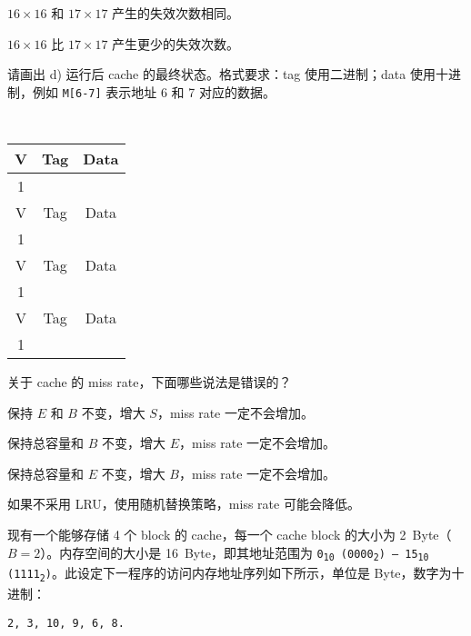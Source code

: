 \begin{problems}
\begin{choices}
                \item $16 \times 16$ 和 $17 \times 17$ 产生的失效次数相同。
                \item $16 \times 16$ 比 $17 \times 17$ 产生更少的失效次数。
            \end{choices}
            \subqn 请画出 d) 运行后 cache 的最终状态。格式要求：tag 使用二进制；data 使用十进制，例如 \verb|M[6-7]| 表示地址 6 和 7 对应的数据。
            \begin{table}[H]
                \tt
                \centering
                \begin{tabular}{|c|c|c|}
                    \hline
                    V & {\qquad \qquad Tag \qquad \qquad} & {\qquad \qquad Data \qquad \qquad} \\ \hline
                    1 &  &  \\ \hline \hline
                    V & Tag & Data \\ \hline
                    1 &  &  \\ \hline \hline
                    V & Tag & Data \\ \hline
                    1 &  &  \\ \hline \hline
                    V & Tag & Data \\ \hline
                    1 &  &  \\ \hline
                \end{tabular}
            \end{table}
         关于 cache 的 miss rate，下面哪些说法是错误的？ 
        \begin{choices}
            \item 保持 $E$ 和 $B$ 不变，增大 $S$，miss rate 一定不会增加。
            \item 保持总容量和 $B$ 不变，增大 $E$，miss rate 一定不会增加。
            \item 保持总容量和 $E$ 不变，增大 $B$，miss rate 一定不会增加。
            \item 如果不采用 LRU，使用随机替换策略，miss rate 可能会降低。
        \end{choices}
         现有一个能够存储 4 个 block 的 cache，每一个 cache block 的大小为 \SI{2}{Byte}（$B=2$）。内存空间的大小是 \SI{16}{Byte}，即其地址范围为 \texttt{0\textsubscript{10} (0000\textsubscript{2}) --- 15\textsubscript{10} (1111\textsubscript{2})}。此设定下一程序的访问内存地址序列如下所示，单位是 Byte，数字为十进制：
        \begin{center}
            \tt 2, 3, 10, 9, 6, 8.

\end{center}
\end{problems}

